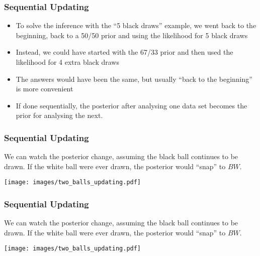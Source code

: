 \documentclass{beamer}
\begin{document}
\begin{frame}
\frametitle{Sequential Updating}

\begin{itemize}
\item To solve the inference with the ``5 black draws'' example,
we went back to the beginning, back to a 50/50 prior and
using the likelihood for 5 black draws\pause
\item Instead, we could have started with the 67/33 prior and then used
the likelihood for 4 extra black draws\pause
\item  The answers would have been the same, but usually
``back to the beginning'' is more convenient\pause
\item If done sequentially, 
the posterior after analysing one data set becomes
the prior for analysing the next.
\end{itemize}


\end{frame}

\begin{frame}
\frametitle{Sequential Updating}
We can watch the posterior change, assuming the black ball continues to be
drawn. If the white ball were ever drawn, the posterior would ``snap'' to $BW$.

\centering
\texttt{[image: images/two\_balls\_updating.pdf]}

\end{frame}


\begin{frame}
\frametitle{Sequential Updating}
We can watch the posterior change, assuming the black ball continues to be
drawn. If the white ball were ever drawn, the posterior would ``snap'' to $BW$.

\centering
\texttt{[image: images/two\_balls\_updating.pdf]}

\end{frame}
\end{document}
